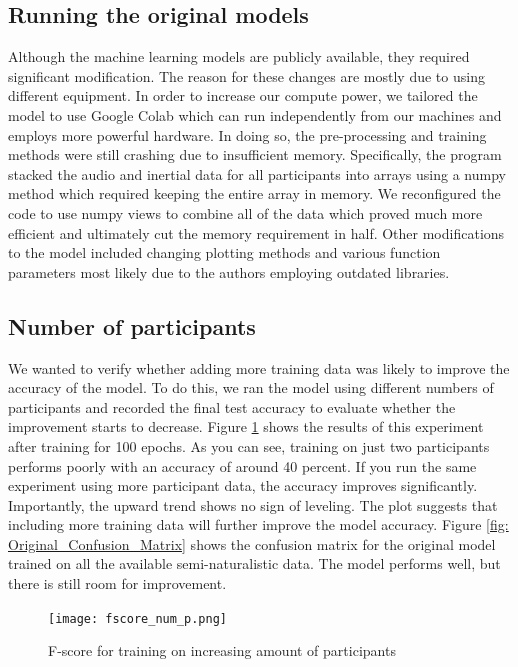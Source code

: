\documentclass[conference]{IEEEtran}
\begin{document}
	\subsection{Running the original models}
	Although the machine learning models are publicly available, they required significant modification. The reason for these changes are mostly due to using different equipment. In order to increase our compute power, we tailored the model to use Google Colab which can run independently from our machines and employs more powerful hardware. In doing so, the pre-processing and training methods were still crashing due to insufficient memory. Specifically, the program stacked the audio and inertial data for all participants into arrays using a numpy method which required keeping the entire array in memory. We reconfigured the code to use numpy views to combine all of the data which proved much more efficient and ultimately cut the memory requirement in half.
	Other modifications to the model included changing plotting methods and various function parameters most likely due to the authors employing outdated libraries.
	
	\subsection{Number of participants}
	We wanted to verify whether adding more training data was likely to improve the accuracy of the model. To do this, we ran the model using different numbers of participants and recorded the final test accuracy to evaluate whether the improvement starts to decrease. Figure \ref{fig: f-score_vs_participants} shows the results of this experiment after training for 100 epochs. As you can see, training on just two participants performs poorly with an accuracy of around 40 percent. If you run the same experiment using more participant data, the accuracy improves significantly. Importantly, the upward trend shows no sign of leveling. The plot suggests that including more training data will further improve the model accuracy. 
	Figure \ref{fig: Original_Confusion_Matrix} shows the confusion matrix for the original model trained on all the available semi-naturalistic data. The model performs well, but there is still room for improvement.
	
	\begin{figure}[h]
		\centering
		\texttt{[image: fscore\_num\_p.png]}
		\caption{F-score for training on increasing amount of participants}
		\label{fig: f-score_vs_participants}
	\end{figure}
	
\end{document}
